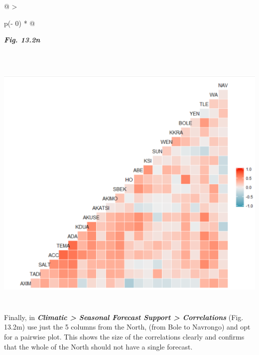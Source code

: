 \documentclass[
  letterpaper,
  DIV=11,
  numbers=noendperiod]{scrreprt}
\begin{document}
\begin{longtable}[]{@{}
  >{\raggedright\arraybackslash}p{(\columnwidth - 0\tabcolsep) * }@{}}
\toprule\noalign{}
\begin{minipage}[b]{\linewidth}\raggedright
\textbf{\emph{Fig. 13.2n}}
\end{minipage} \\
\midrule\noalign{}
\endhead
\bottomrule\noalign{}
\endlastfoot
\includegraphics[width=5.91378in,height=5.0391in]{figures/Fig13.2n.png} \\
\end{longtable}

Finally, in \textbf{\emph{Climatic \textgreater{} Seasonal Forecast
Support \textgreater{} Correlations}} (Fig. 13.2m) use just the 5
columns from the North, (from Bole to Navrongo) and opt for a pairwise
plot. This shows the size of the correlations clearly and confirms that
the whole of the North should not have a single forecast.
\end{document}
